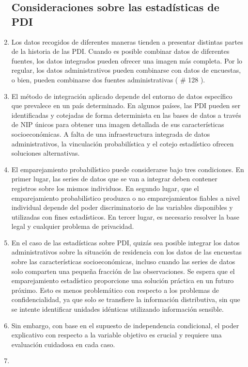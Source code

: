 \documentclass[
]{book}
\begin{document}
\begin{enumerate}
{  \subsection{Consideraciones sobre las estadísticas de PDI}\label{consideraciones-sobre-las-estaduxedsticas-de-pdi}}
\item
  Los datos recogidos de diferentes maneras tienden a presentar distintas partes de la historia de las PDI. Cuando es posible combinar datos de diferentes fuentes, los datos integrados pueden ofrecer una imagen más completa. Por lo regular, los datos administrativos pueden combinarse con datos de encuestas, o bien, pueden combinarse dos fuentes administrativas (
  \# 128
  ).
\item
  El método de integración aplicado depende del entorno de datos específico que prevalece en un país determinado. En algunos países, las PDI pueden ser identificadas y cotejadas de forma determinista en las bases de datos a través de NIP únicos para obtener una imagen detallada de sus características socioeconómicas. A falta de una infraestructura integrada de datos administrativos, la vinculación probabilística y el cotejo estadístico ofrecen soluciones alternativas.
\item
  El emparejamiento probabilístico puede considerarse bajo tres condiciones. En primer lugar, las series de datos que se van a integrar deben contener registros sobre los mismos individuos. En segundo lugar, que el emparejamiento probabilístico produzca o no emparejamientos fiables a nivel individual depende del poder discriminatorio de las variables disponibles y utilizadas con fines estadísticos. En tercer lugar, es necesario resolver la base legal y cualquier problema de privacidad.
\item
  En el caso de las estadísticas sobre PDI, quizás sea posible integrar los datos administrativos sobre la situación de residencia con los datos de las encuestas sobre las características socioeconómicas, incluso cuando las series de datos solo comparten una pequeña fracción de las observaciones. Se espera que el emparejamiento estadístico proporcione una solución práctica en un futuro próximo. Esto es menos problemático con respecto a los problemas de confidencialidad, ya que solo se transfiere la información distributiva, sin que se intente identificar unidades idénticas utilizando información sensible.
\item
  Sin embargo, con base en el supuesto de independencia condicional, el poder explicativo con respecto a la variable objetivo es crucial y requiere una evaluación cuidadosa en cada caso.
\item ~
  \hypertarget{enfoques-para-el-cotejo-de-datos}{%
}
\end{enumerate}
\end{document}
